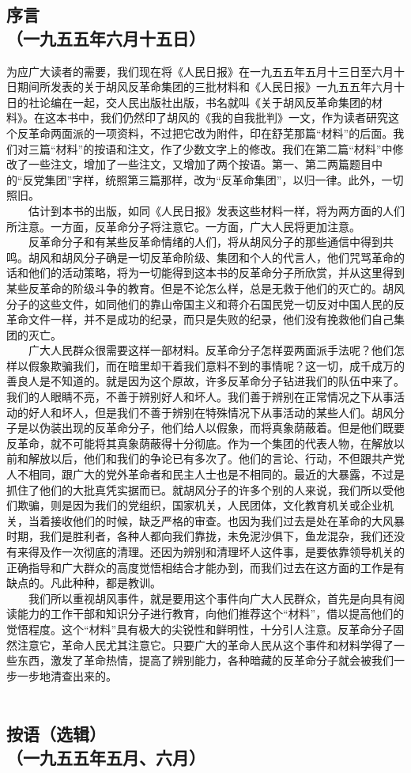 \documentclass[cn,11pt,chinese]{elegantbook}
\def\myformat#1{\hfil\hfil #1}
\begin{document}
\subsection*{\myformat{序言}\\\myformat{（一九五五年六月十五日）}}
为应广大读者的需要，我们现在将《人民日报》在一九五五年五月十三日至六月十日期间所发表的关于胡风反革命集团的三批材料和《人民日报》一九五五年六月十日的社论编在一起，交人民出版社出版，书名就叫《关于胡风反革命集团的材料》。在这本书中，我们仍然印了胡风的《我的自我批判》一文，作为读者研究这个反革命两面派的一项资料，不过把它改为附件，印在舒芜那篇“材料”的后面。我们对三篇“材料”的按语和注文，作了少数文字上的修改。我们在第二篇“材料”中修改了一些注文，增加了一些注文，又增加了两个按语。第一、第二两篇题目中的“反党集团”字样，统照第三篇那样，改为“反革命集团”，以归一律。此外，一切照旧。\\
　　估计到本书的出版，如同《人民日报》发表这些材料一样，将为两方面的人们所注意。一方面，反革命分子将注意它。一方面，广大人民将更加注意。\\
　　反革命分子和有某些反革命情绪的人们，将从胡风分子的那些通信中得到共鸣。胡风和胡风分子确是一切反革命阶级、集团和个人的代言人，他们咒骂革命的话和他们的活动策略，将为一切能得到这本书的反革命分子所欣赏，并从这里得到某些反革命的阶级斗争的教育。但是不论怎么样，总是无救于他们的灭亡的。胡风分子的这些文件，如同他们的靠山帝国主义和蒋介石国民党一切反对中国人民的反革命文件一样，并不是成功的纪录，而只是失败的纪录，他们没有挽救他们自己集团的灭亡。\\
　　广大人民群众很需要这样一部材料。反革命分子怎样耍两面派手法呢？他们怎样以假象欺骗我们，而在暗里却干着我们意料不到的事情呢？这一切，成千成万的善良人是不知道的。就是因为这个原故，许多反革命分子钻进我们的队伍中来了。我们的人眼睛不亮，不善于辨别好人和坏人。我们善于辨别在正常情况之下从事活动的好人和坏人，但是我们不善于辨别在特殊情况下从事活动的某些人们。胡风分子是以伪装出现的反革命分子，他们给人以假象，而将真象荫蔽着。但是他们既要反革命，就不可能将其真象荫蔽得十分彻底。作为一个集团的代表人物，在解放以前和解放以后，他们和我们的争论已有多次了。他们的言论、行动，不但跟共产党人不相同，跟广大的党外革命者和民主人士也是不相同的。最近的大暴露，不过是抓住了他们的大批真凭实据而已。就胡风分子的许多个别的人来说，我们所以受他们欺骗，则是因为我们的党组织，国家机关，人民团体，文化教育机关或企业机关，当着接收他们的时候，缺乏严格的审查。也因为我们过去是处在革命的大风暴时期，我们是胜利者，各种人都向我们靠拢，未免泥沙俱下，鱼龙混杂，我们还没有来得及作一次彻底的清理。还因为辨别和清理坏人这件事，是要依靠领导机关的正确指导和广大群众的高度觉悟相结合才能办到，而我们过去在这方面的工作是有缺点的。凡此种种，都是教训。\\
　　我们所以重视胡风事件，就是要用这个事件向广大人民群众，首先是向具有阅读能力的工作干部和知识分子进行教育，向他们推荐这个“材料”，借以提高他们的觉悟程度。这个“材料”具有极大的尖锐性和鲜明性，十分引人注意。反革命分子固然注意它，革命人民尤其注意它。只要广大的革命人民从这个事件和材料学得了一些东西，激发了革命热情，提高了辨别能力，各种暗藏的反革命分子就会被我们一步一步地清查出来的。\\
　\subsection*{\myformat{按语（选辑）
}\\\myformat{（一九五五年五月、六月）}}
\end{document}
